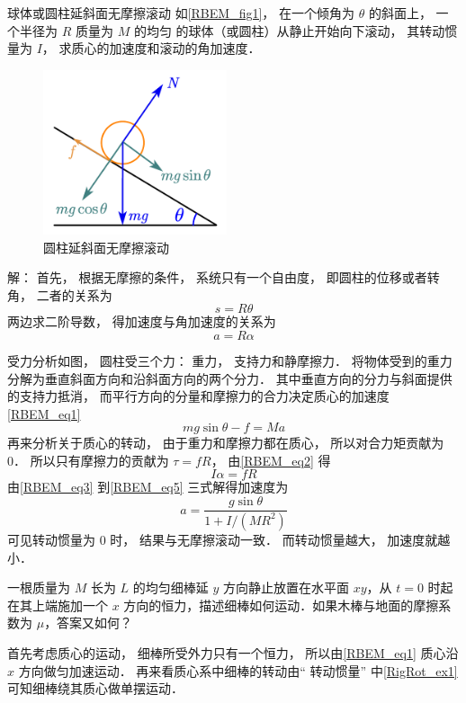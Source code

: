 \begin{example}{球体或圆柱延斜面无摩擦滚动}\label{RBEM_ex1}
如\autoref{RBEM_fig1}， 在一个倾角为 $\theta$ 的斜面上， 一个半径为 $R$ 质量为 $M$ 的均匀 的球体（或圆柱）从静止开始向下滚动， 其转动惯量为 $I$， 求质心的加速度和滚动的角加速度．

\begin{figure}[ht]
\centering
\includegraphics[width=5.4cm]{./figures/RBEM_1.pdf}
\caption{圆柱延斜面无摩擦滚动} \label{RBEM_fig1}
\end{figure}

解： 首先， 根据无摩擦的条件， 系统只有一个自由度， 即圆柱的位移或者转角， 二者的关系为
\begin{equation}
s = R\theta
\end{equation}
两边求二阶导数， 得加速度与角加速度的关系为
\begin{equation}\label{RBEM_eq3}
a = R\alpha
\end{equation}

受力分析如图， 圆柱受三个力： 重力， 支持力和静摩擦力． 将物体受到的重力分解为垂直斜面方向和沿斜面方向的两个分力． 其中垂直方向的分力与斜面提供的支持力抵消， 而平行方向的分量和摩擦力的合力决定质心的加速度\autoref{RBEM_eq1}
\begin{equation}\label{RBEM_eq4}
mg\sin\theta - f = Ma
\end{equation}
再来分析关于质心的转动， 由于重力和摩擦力都在质心， 所以对合力矩贡献为 0． 所以只有摩擦力的贡献为 $\tau = fR$， 由\autoref{RBEM_eq2} 得
\begin{equation}\label{RBEM_eq5}
I\alpha = f R
\end{equation}
由\autoref{RBEM_eq3} 到\autoref{RBEM_eq5} 三式解得加速度为
\begin{equation}
a = \frac{g \sin\theta}{1 + I/(MR^2)}
\end{equation}
可见转动惯量为 0 时， 结果与无摩擦滚动一致． 而转动惯量越大， 加速度就越小．
\end{example}

\begin{example}{}
一根质量为 $M$ 长为 $L$ 的均匀细棒延 $y$ 方向静止放置在水平面 $xy$，从 $t=0$ 时起在其上端施加一个 $x$ 方向的恒力，描述细棒如何运动．如果木棒与地面的摩擦系数为 $\mu$，答案又如何？

首先考虑质心的运动， 细棒所受外力只有一个恒力， 所以由\autoref{RBEM_eq1} 质心沿 $x$ 方向做匀加速运动． 再来看质心系中细棒的转动由“ 转动惯量” 中\autoref{RigRot_ex1} 可知细棒绕其质心做单摆运动．
\end{example}
